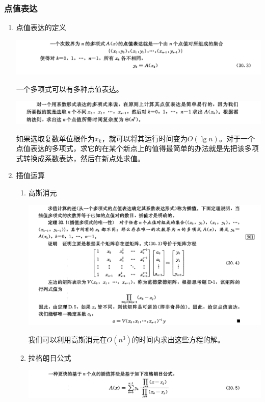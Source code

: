 \documentclass[11pt]{article}
\begin{document}
\subsubsection{点值表达}
\label{sec-1-3-2}
\begin{enumerate}
\item 点值表达的定义
\label{sec-1-3-2-1}

\includegraphics[width=.9\linewidth]{./Source/Polynomial/6.png}

一个多项式可以有多种点值表达。

\includegraphics[width=.9\linewidth]{./Source/Polynomial/7.png}

如果选取复数单位根作为\(x_k\)，就可以将其运行时间变为\(O(\lg n)\)。对于一个点值表达的多项式，求它的在某个新点上的值得最简单的办法就是先把该多项式转换成系数表达，然后在新点处求值。

\item 插值运算
\label{sec-1-3-2-2}
\begin{enumerate}
\item 高斯消元
\label{sec-1-3-2-2-1}

\includegraphics[width=.9\linewidth]{./Source/Polynomial/8.png}

我们可以利用高斯消元在\(O(n^3)\)的时间内求出这些方程的解。

\item 拉格朗日公式
\label{sec-1-3-2-2-2}

\includegraphics[width=.9\linewidth]{./Source/Polynomial/9.png}


\end{enumerate}
\end{enumerate}
\end{document}
